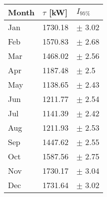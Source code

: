 \begin{tabular}{lll}
\toprule
Month & $\tau$ [kW] &   $I_{95\%}$ \\
\midrule
  Jan &     1730.18 &   $\pm$ 3.02 \\
  Feb &     1570.83 &   $\pm$ 2.68 \\
  Mar &     1468.02 &   $\pm$ 2.56 \\
  Apr &     1187.48 &    $\pm$ 2.5 \\
  May &     1138.65 &   $\pm$ 2.43 \\
  Jun &     1211.77 &   $\pm$ 2.54 \\
  Jul &     1141.39 &   $\pm$ 2.42 \\
  Aug &     1211.93 &   $\pm$ 2.53 \\
  Sep &     1447.62 &   $\pm$ 2.55 \\
  Oct &     1587.56 &   $\pm$ 2.75 \\
  Nov &     1730.17 &   $\pm$ 3.04 \\
  Dec &     1731.64 &   $\pm$ 3.02 \\
\bottomrule
\end{tabular}

